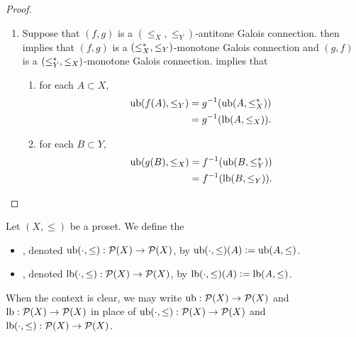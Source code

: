 \documentclass{book}
\begin{document}
\begin{proof}
\begin{enumerate}
\begin{enumerate}
				\begin{align*}
					\lbd(g(B), \leq_X) 
					& = \ubd(g(B), \lop_X) \\
					& = f^{-1}(\ubd (B, \lop_Y)) \\
					& = f^{-1}(\lbd (B, \leq_Y)).
				\end{align*}
			\end{enumerate}
			\item Suppose that $(f,g)$ is a $(\leq_X, \leq_Y)$-antitone Galois connection.  then implies that $(f,g)$ is a $(\leq^*_X, \leq_Y)$-monotone Galois connection and $(g,f)$ is a $(\leq^*_Y, \leq_X)$-monotone Galois connection.  implies that
			\begin{enumerate}
				\item for each $A \subset X$, 
				\begin{align*}
					\operatorname{ub}(f(A), \leq_Y)
					& = g^{-1}(\operatorname{ub}(A, \leq^*_X)) \\
					& = g^{-1}(\operatorname{lb} (A, \leq_X)).
				\end{align*}
				\item for each $B \subset Y$,
				\begin{align*}
					\operatorname{ub} (g(B), \leq_X)
					& = f^{-1}(\operatorname{ub}(B, \leq^*_Y)) \\
					& = f^{-1}(\operatorname{lb} (B, \leq_Y)).
				\end{align*}
			\end{enumerate}
		\end{enumerate}
	\end{proof}
	
	\begin{defn} 
		Let $(X, \leq)$ be a proset. We define the 
		\begin{itemize}
			\item {}, denoted $\operatorname{ub}(\cdot, \leq): \mathcal{P}(X) \rightarrow \mathcal{P}(X)$, by $\operatorname{ub}(\cdot, \leq)(A) \vcentcolon= \operatorname{ub}(A, \leq)$. 
			\item {}, denoted $\operatorname{lb}(\cdot, \leq): \mathcal{P}(X) \rightarrow \mathcal{P}(X)$, by $\operatorname{lb}(\cdot, \leq)(A) \vcentcolon= \operatorname{lb}(A, \leq)$. 
		\end{itemize}
	\end{defn}
	
	\begin{note}
		When the context is clear, we may write $\operatorname{ub} : \mathcal{P}(X) \rightarrow \mathcal{P}(X)$ and $\operatorname{lb} : \mathcal{P}(X) \rightarrow \mathcal{P}(X)$ in place of $\operatorname{ub}(\cdot, \leq) : \mathcal{P}(X) \rightarrow \mathcal{P}(X)$ and $\operatorname{lb}(\cdot, \leq) : \mathcal{P}(X) \rightarrow \mathcal{P}(X)$.
	\end{note}
	
\end{document}
